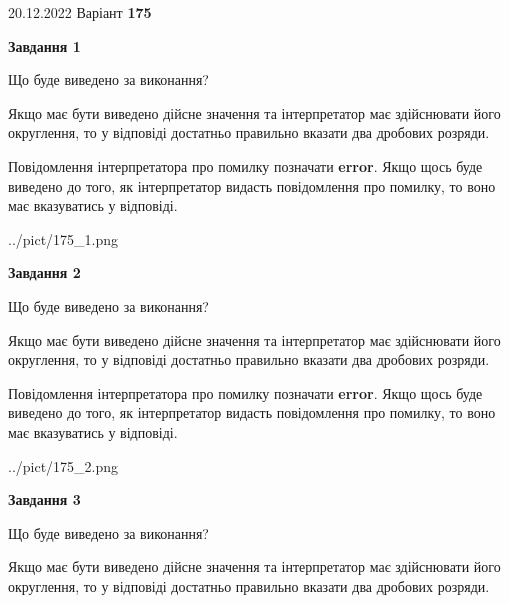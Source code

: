 \documentclass[12pt, ukrainian]{article}
\begin{document}
{20.12.2022 Варіант \No \textbf { 175 }\par}
{
\begin {Large}

{\begin {center}\textbf{Завдання 1}\end {center}}\par
Що буде виведено за виконання? \par

Якщо має бути виведено дійсне значення та інтерпретатор має здійснювати його округлення, 
то у відповіді достатньо правильно вказати два дробових розряди.

Повідомлення інтерпретатора про помилку позначати \textbf{error}.
Якщо щось буде виведено до того, як інтерпретатор видасть повідомлення про помилку, 
то воно має вказуватись у відповіді. \par

\begin{center}
	{../pict/175_1.png}
\end{center}
\newpage

{\begin {center}\textbf{Завдання 2}\end {center}}\par
Що буде виведено за виконання? \par

Якщо має бути виведено дійсне значення та інтерпретатор має здійснювати його округлення, 
то у відповіді достатньо правильно вказати два дробових розряди.

Повідомлення інтерпретатора про помилку позначати \textbf{error}.
Якщо щось буде виведено до того, як інтерпретатор видасть повідомлення про помилку, 
то воно має вказуватись у відповіді. \par

\begin{center}
	{../pict/175_2.png}
\end{center}
\newpage

{\begin {center}\textbf{Завдання 3}\end {center}}\par
Що буде виведено за виконання? \par

Якщо має бути виведено дійсне значення та інтерпретатор має здійснювати його округлення, 
то у відповіді достатньо правильно вказати два дробових розряди.


\end{Large}}
\end{document}
